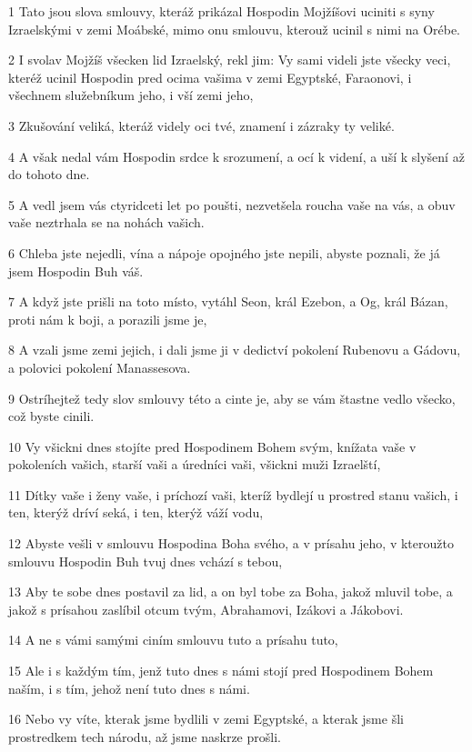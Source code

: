 \par 1 Tato jsou slova smlouvy, kteráž prikázal Hospodin Mojžíšovi uciniti s syny Izraelskými v zemi Moábské, mimo onu smlouvu, kterouž ucinil s nimi na Orébe.
\par 2 I svolav Mojžíš všecken lid Izraelský, rekl jim: Vy sami videli jste všecky veci, kteréž ucinil Hospodin pred ocima vašima v zemi Egyptské, Faraonovi, i všechnem služebníkum jeho, i vší zemi jeho,
\par 3 Zkušování veliká, kteráž videly oci tvé, znamení i zázraky ty veliké.
\par 4 A však nedal vám Hospodin srdce k srozumení, a ocí k videní, a uší k slyšení až do tohoto dne.
\par 5 A vedl jsem vás ctyridceti let po poušti, nezvetšela roucha vaše na vás, a obuv vaše neztrhala se na nohách vašich.
\par 6 Chleba jste nejedli, vína a nápoje opojného jste nepili, abyste poznali, že já jsem Hospodin Buh váš.
\par 7 A když jste prišli na toto místo, vytáhl Seon, král Ezebon, a Og, král Bázan, proti nám k boji, a porazili jsme je,
\par 8 A vzali jsme zemi jejich, i dali jsme ji v dedictví pokolení Rubenovu a Gádovu, a polovici pokolení Manassesova.
\par 9 Ostríhejtež tedy slov smlouvy této a cinte je, aby se vám štastne vedlo všecko, což byste cinili.
\par 10 Vy všickni dnes stojíte pred Hospodinem Bohem svým, knížata vaše v pokoleních vašich, starší vaši a úredníci vaši, všickni muži Izraelští,
\par 11 Dítky vaše i ženy vaše, i príchozí vaši, kteríž bydlejí u prostred stanu vašich, i ten, kterýž dríví seká, i ten, kterýž váží vodu,
\par 12 Abyste vešli v smlouvu Hospodina Boha svého, a v prísahu jeho, v kteroužto smlouvu Hospodin Buh tvuj dnes vchází s tebou,
\par 13 Aby te sobe dnes postavil za lid, a on byl tobe za Boha, jakož mluvil tobe, a jakož s prísahou zaslíbil otcum tvým, Abrahamovi, Izákovi a Jákobovi.
\par 14 A ne s vámi samými ciním smlouvu tuto a prísahu tuto,
\par 15 Ale i s každým tím, jenž tuto dnes s námi stojí pred Hospodinem Bohem naším, i s tím, jehož není tuto dnes s námi.
\par 16 Nebo vy víte, kterak jsme bydlili v zemi Egyptské, a kterak jsme šli prostredkem tech národu, až jsme naskrze prošli.
